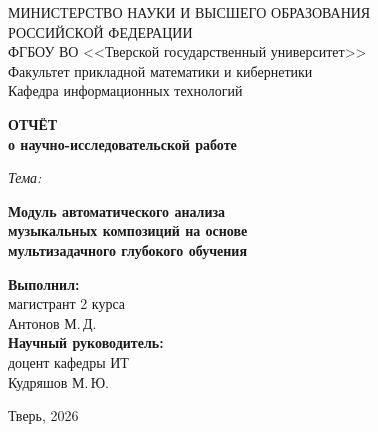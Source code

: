 \begin{titlepage}
\begin{center}

{\fontsize{12}{14}\selectfont
МИНИСТЕРСТВО НАУКИ И ВЫСШЕГО ОБРАЗОВАНИЯ\\
РОССИЙСКОЙ ФЕДЕРАЦИИ\\[6pt]
ФГБОУ ВО <<Тверской государственный университет>>\\[6pt]
Факультет прикладной математики и кибернетики\\
Кафедра информационных технологий
}

\vspace{4cm}

{\fontsize{16}{20}\selectfont\bfseries
ОТЧЁТ\\
о научно-исследовательской работе
}

\vspace{1.5cm}

{\fontsize{14}{18}\selectfont\itshape
Тема:
}

\vspace{0.5cm}

{\fontsize{15}{19}\selectfont\bfseries
Модуль автоматического анализа\\
музыкальных композиций на основе\\
мультизадачного глубокого обучения
}

\vfill

\begin{flushright}
\begin{minipage}{0.55\textwidth}
\fontsize{13}{17}\selectfont
\textbf{Выполнил:}\\
магистрант 2 курса\\
Антонов М.\,Д.\\[18pt]

\textbf{Научный руководитель:}\\
доцент кафедры ИТ\\
Кудряшов М.\,Ю.
\end{minipage}
\end{flushright}

\vfill

{\fontsize{12}{14}\selectfont
Тверь, 2026
}

\end{center}
\end{titlepage}
\newpage
